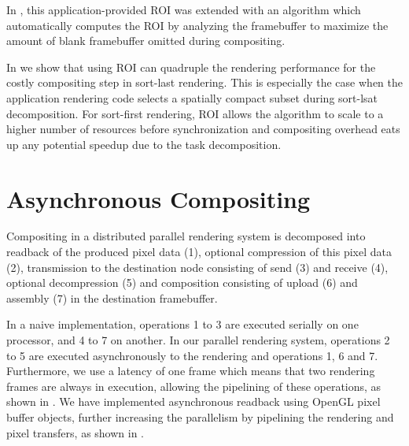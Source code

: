 In \cite{MEP:10}, this application-provided ROI was extended with an algorithm
which automatically computes the ROI by analyzing the framebuffer to maximize
the amount of blank framebuffer omitted during compositing.

In \cite{EBAHMP:12} we show that using ROI can quadruple the rendering
performance for the costly compositing step in sort-last rendering. This is
especially the case when the application rendering code selects a spatially
compact subset during sort-lsat decomposition. For sort-first rendering, ROI
allows the algorithm to scale to a higher number of resources before
synchronization and compositing overhead eats up any potential speedup due to
the task decomposition.

\section{Asynchronous Compositing}

Compositing in a distributed parallel rendering system is decomposed into
readback of the produced pixel data (1), optional compression of this pixel data
(2), transmission to the destination node consisting of send (3) and receive
(4), optional decompression (5) and composition consisting of upload (6) and
assembly (7) in the destination framebuffer.

In a naive implementation, operations 1 to 3 are executed serially on one
processor, and 4 to 7 on another. In our parallel rendering system, operations 2
to 5 are executed asynchronously to the rendering and operations 1, 6 and 7.
Furthermore, we use a latency of one frame which means that two rendering frames
are always in execution, allowing the pipelining of these operations, as shown
in . We have implemented asynchronous readback using OpenGL pixel
buffer objects, further increasing the parallelism by pipelining the rendering
and pixel transfers, as shown in .

